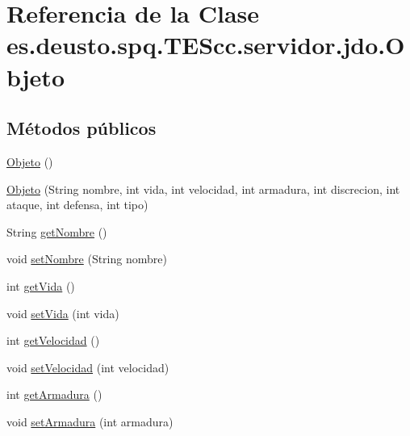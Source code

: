 \hypertarget{classes_1_1deusto_1_1spq_1_1_t_e_scc_1_1servidor_1_1jdo_1_1_objeto}{\section{Referencia de la Clase es.\+deusto.\+spq.\+T\+E\+Scc.\+servidor.\+jdo.\+Objeto}
\label{classes_1_1deusto_1_1spq_1_1_t_e_scc_1_1servidor_1_1jdo_1_1_objeto}
}
\subsection*{Métodos públicos}
\begin{DoxyCompactItemize}
\item 
\hyperlink{classes_1_1deusto_1_1spq_1_1_t_e_scc_1_1servidor_1_1jdo_1_1_objeto_ae1a67a6e5f6e14632ec622d5e8c3ef1d}{Objeto} ()
\item 
\hyperlink{classes_1_1deusto_1_1spq_1_1_t_e_scc_1_1servidor_1_1jdo_1_1_objeto_aa05dd1436222a60576fa7d6a4956e63b}{Objeto} (String nombre, int vida, int velocidad, int armadura, int discrecion, int ataque, int defensa, int tipo)
\item 
String \hyperlink{classes_1_1deusto_1_1spq_1_1_t_e_scc_1_1servidor_1_1jdo_1_1_objeto_ad677d91180ca77d2ba2d3e84524c9023}{get\+Nombre} ()
\item 
void \hyperlink{classes_1_1deusto_1_1spq_1_1_t_e_scc_1_1servidor_1_1jdo_1_1_objeto_aa36e75ff0feb1e50292bba4bfdaffa99}{set\+Nombre} (String nombre)
\item 
int \hyperlink{classes_1_1deusto_1_1spq_1_1_t_e_scc_1_1servidor_1_1jdo_1_1_objeto_a40079a07ad9ee70cfef818601a52e5a1}{get\+Vida} ()
\item 
void \hyperlink{classes_1_1deusto_1_1spq_1_1_t_e_scc_1_1servidor_1_1jdo_1_1_objeto_a528ca922ef15618d4baef73e2de4a4de}{set\+Vida} (int vida)
\item 
int \hyperlink{classes_1_1deusto_1_1spq_1_1_t_e_scc_1_1servidor_1_1jdo_1_1_objeto_ad6edabe746803dc65fc9c7705aa8ac7d}{get\+Velocidad} ()
\item 
void \hyperlink{classes_1_1deusto_1_1spq_1_1_t_e_scc_1_1servidor_1_1jdo_1_1_objeto_a3d88780721f80ee28b41526297cd5a3a}{set\+Velocidad} (int velocidad)
\item 
int \hyperlink{classes_1_1deusto_1_1spq_1_1_t_e_scc_1_1servidor_1_1jdo_1_1_objeto_ae4297a07383ea9da8319c8fe5da18266}{get\+Armadura} ()
\item 
void \hyperlink{classes_1_1deusto_1_1spq_1_1_t_e_scc_1_1servidor_1_1jdo_1_1_objeto_ad95d13fbd823ea147a1b405147ff70b8}{set\+Armadura} (int armadura)

\end{DoxyCompactItemize}
